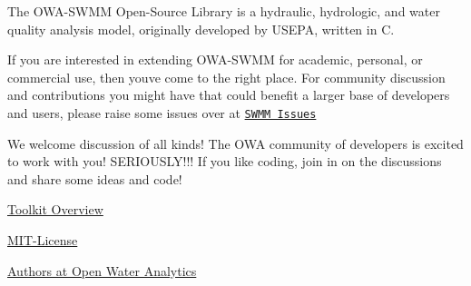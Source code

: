 The O\+W\+A-\/\+S\+W\+MM Open-\/\+Source Library is a hydraulic, hydrologic, and water quality analysis model, originally developed by U\+S\+E\+PA, written in C.

If you are interested in extending O\+W\+A-\/\+S\+W\+MM for academic, personal, or commercial use, then you\textquotesingle{}ve come to the right place. For community discussion and contributions you might have that could benefit a larger base of developers and users, please raise some issues over at \href{https://github.com/OpenWaterAnalytics/Stormwater-Management-Model/issues}{\tt S\+W\+MM Issues}

We welcome discussion of all kinds! The O\+WA community of developers is excited to work with you! S\+E\+R\+I\+O\+U\+S\+L\+Y!!! If you like coding, join in on the discussions and share some ideas and code!


\begin{DoxyItemize}
\item \hyperlink{toolkit-overview}{Toolkit Overview}
\item \hyperlink{group___m_i_t-_license}{M\+I\+T-\/\+License}
\item \hyperlink{group___a_u_t_h_o_r_s}{Authors at Open Water Analytics} 
\end{DoxyItemize}